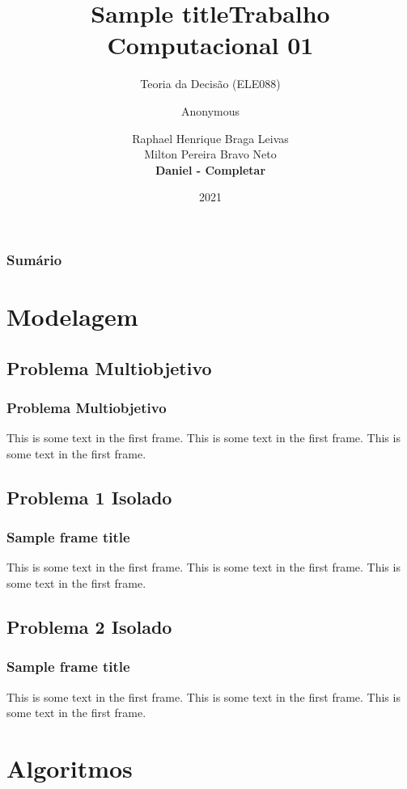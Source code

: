 \documentclass{beamer}
\title{Sample title}
\author{Anonymous}
\institute{Overleaf}
\date{2021}
\title[Short Paper Title]  
{Trabalho Computacional 01}
\subtitle
{Teoria da Decisão (ELE088)}
\author 
 { Raphael Henrique Braga Leivas \\
 Milton Pereira Bravo Neto \\ 
 \textbf{Daniel - Completar}}
\institute 
{
Curso de Bacharelado em Engenharia de Sistemas\\
Universidade Federal de Minas Gerais
}
\begin{document}
\begin{frame}
    \titlepage
\end{frame}

\begin{frame}
    \frametitle{Sumário}
    \tableofcontents
\end{frame}

\section{Modelagem}
    \subsection{Problema Multiobjetivo}
    \begin{frame}
        \frametitle{Problema Multiobjetivo}
        This is some text in the first frame. This is some text in the first frame. This is some text in the first frame.
        \end{frame}
    \subsection{Problema 1 Isolado}
    \begin{frame}
        \frametitle{Sample frame title}
        This is some text in the first frame. This is some text in the first frame. This is some text in the first frame.
        \end{frame}
    \subsection{Problema 2 Isolado}
    \begin{frame}
        \frametitle{Sample frame title}
        This is some text in the first frame. This is some text in the first frame. This is some text in the first frame.
        \end{frame}
\section{Algoritmos}
\end{document}

